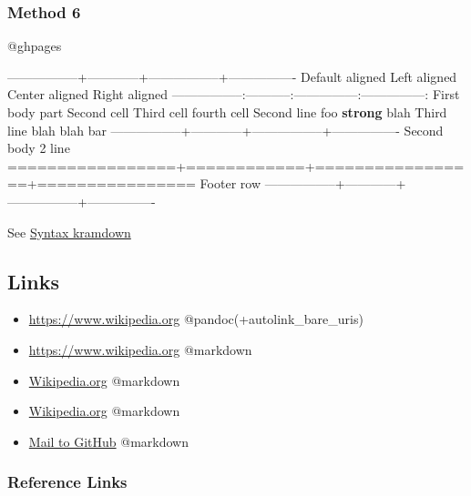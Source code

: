 \documentclass[]{article}
\providecommand{\tightlist}{%
  \setlength{\itemsep}{0pt}\setlength{\parskip}{0pt}}
\begin{document}
\subsubsection{Method 6}\label{method-6}

@ghpages

\textbar{}-----------------+------------+-----------------+----------------\textbar{}
\textbar{} Default aligned \textbar{}Left aligned\textbar{} Center
aligned \textbar{} Right aligned \textbar{}
\textbar{}-----------------\textbar{}:-----------\textbar{}:---------------:\textbar{}---------------:\textbar{}
\textbar{} First body part \textbar{}Second cell \textbar{} Third cell
\textbar{} fourth cell \textbar{} \textbar{} Second line \textbar{}foo
\textbar{} \textbf{strong} \textbar{} blah \textbar{} \textbar{} Third
line \textbar{}blah \textbar{} blah \textbar{} bar \textbar{}
\textbar{}-----------------+------------+-----------------+----------------\textbar{}
\textbar{} Second body \textbar{} \textbar{} \textbar{} \textbar{}
\textbar{} 2 line \textbar{} \textbar{} \textbar{} \textbar{}
\textbar{}=================+============+=================+================\textbar{}
\textbar{} Footer row \textbar{} \textbar{} \textbar{} \textbar{}
\textbar{}-----------------+------------+-----------------+----------------\textbar{}

See \href{http://kramdown.gettalong.org/syntax.html\#tables}{Syntax
\textbar{} kramdown}

\subsection{Links}\label{links}

\begin{itemize}
\tightlist
\item
  \url{https://www.wikipedia.org} @pandoc(+autolink\_bare\_uris)
\item
  \url{https://www.wikipedia.org} @markdown
\item
  \href{https://www.wikipedia.org}{Wikipedia.org} @markdown
\item
  \href{https://www.wikipedia.org}{Wikipedia.org} @markdown
\item
  \href{mailto:support@github.com}{Mail to GitHub} @markdown
\end{itemize}

\subsubsection{Reference Links}\label{reference-links}
\end{document}
